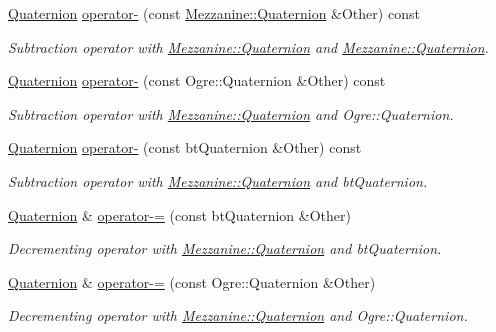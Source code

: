 \begin{DoxyCompactItemize}
\hyperlink{classMezzanine_1_1Quaternion}{Quaternion} \hyperlink{classMezzanine_1_1Quaternion_a9ac4c2827e1f185dd804012b440c9677}{operator-\/} (const \hyperlink{classMezzanine_1_1Quaternion}{Mezzanine::Quaternion} \&Other) const 
\begin{DoxyCompactList}\small\item\em Subtraction operator with \hyperlink{classMezzanine_1_1Quaternion}{Mezzanine::Quaternion} and \hyperlink{classMezzanine_1_1Quaternion}{Mezzanine::Quaternion}. \item\end{DoxyCompactList}\item 
\hyperlink{classMezzanine_1_1Quaternion}{Quaternion} \hyperlink{classMezzanine_1_1Quaternion_a0bee32c0dc25971e4ec9ba614c2b1d6b}{operator-\/} (const Ogre::Quaternion \&Other) const 
\begin{DoxyCompactList}\small\item\em Subtraction operator with \hyperlink{classMezzanine_1_1Quaternion}{Mezzanine::Quaternion} and Ogre::Quaternion. \item\end{DoxyCompactList}\item 
\hyperlink{classMezzanine_1_1Quaternion}{Quaternion} \hyperlink{classMezzanine_1_1Quaternion_a914d4e0e7615d15ffae8d28a8b002eb9}{operator-\/} (const btQuaternion \&Other) const 
\begin{DoxyCompactList}\small\item\em Subtraction operator with \hyperlink{classMezzanine_1_1Quaternion}{Mezzanine::Quaternion} and btQuaternion. \item\end{DoxyCompactList}\item 
\hyperlink{classMezzanine_1_1Quaternion}{Quaternion} \& \hyperlink{classMezzanine_1_1Quaternion_a505917a83a099243cb519bc8419a74a8}{operator-\/=} (const btQuaternion \&Other)
\begin{DoxyCompactList}\small\item\em Decrementing operator with \hyperlink{classMezzanine_1_1Quaternion}{Mezzanine::Quaternion} and btQuaternion. \item\end{DoxyCompactList}\item 
\hyperlink{classMezzanine_1_1Quaternion}{Quaternion} \& \hyperlink{classMezzanine_1_1Quaternion_a38c9468ab71721d126d3f2639b23211f}{operator-\/=} (const Ogre::Quaternion \&Other)
\begin{DoxyCompactList}\small\item\em Decrementing operator with \hyperlink{classMezzanine_1_1Quaternion}{Mezzanine::Quaternion} and Ogre::Quaternion. \item\end{DoxyCompactList}\item 

\end{DoxyCompactItemize}
